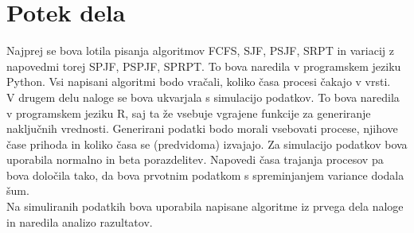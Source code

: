 \documentclass[a4paper, pt14]{article}
\begin{document}
\newpage
\section{Potek dela}

Najprej se bova lotila pisanja algoritmov FCFS, SJF, PSJF, SRPT in variacij z napovedmi torej SPJF, PSPJF, SPRPT. 
To bova naredila v programskem jeziku Python.
Vsi napisani algoritmi bodo vračali, koliko časa procesi čakajo v vrsti.\\
V drugem delu naloge se bova ukvarjala s simulacijo podatkov. To bova naredila v programskem jeziku R, saj ta že vsebuje vgrajene funkcije za generiranje naključnih vrednosti.
Generirani podatki bodo morali vsebovati procese, njihove čase prihoda in koliko časa se (predvidoma) izvajajo.
Za simulacijo podatkov bova uporabila normalno in beta porazdelitev. 
Napovedi časa trajanja procesov pa bova določila tako, da bova prvotnim podatkom s spreminjanjem variance dodala šum. \\
Na simuliranih podatkih bova uporabila napisane algoritme iz prvega dela naloge in naredila analizo razultatov.
\end{document}
